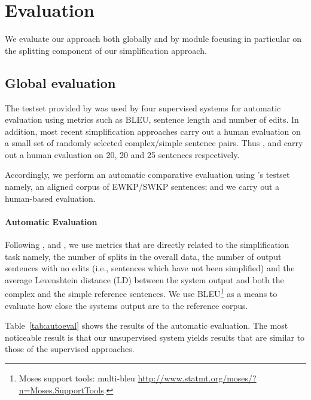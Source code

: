 \documentclass[11pt,a4paper]{article}
\begin{document}
\section{Evaluation}
\label{sec:xps}

We evaluate our approach both globally and by module focusing in
particular on the splitting component of our simplification approach.

\subsection{Global evaluation}

The testset provided by  was used by four
supervised systems for automatic evaluation using metrics such as
BLEU, sentence length and number of edits. In addition, most recent
simplification approaches carry out a human evaluation on a small set
of randomly selected complex/simple sentence pairs. Thus
,  and
 carry out a human evaluation on
20, 20 and 25 sentences respectively.

Accordingly, we perform an automatic comparative evaluation using
\cite{zhu2010monolingual}'s testset namely, an aligned corpus of
 EWKP/SWKP sentences; and we carry out a human-based
evaluation.





\paragraph{Automatic Evaluation}

Following , 
and , we use metrics that are directly
related to the simplification task namely, the number of splits in the
overall data, the number of output sentences with no edits (i.e.,
sentences which have not been simplified) and the average Levenshtein
distance (LD) between the system output and both the complex and the
simple reference sentences. We use BLEU\footnote{Moses support tools:
  multi-bleu \url{http://www.statmt.org/moses/?n=Moses.SupportTools}.}
as a means to evaluate how close the systems output are to the
reference corpus.

Table~\ref{tab:autoeval} shows the results of the automatic
evaluation.  The most noticeable result is that our unsupervised
system yields results that are similar to those of the supervised
approaches. 
\end{document}
